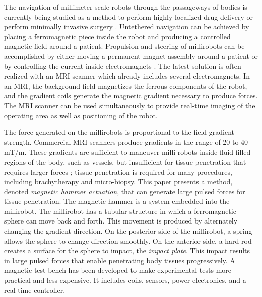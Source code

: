 \documentclass[letterpaper, 10 pt, conference]{ieeeconf}  %
\begin{document}
The navigation of millimeter-scale robots through the passageways of bodies is currently being studied as a method to perform highly localized drug delivery or perform minimally invasive surgery \cite{7067029,702,mi2020295}. Untethered navigation can be achieved by placing a ferromagnetic piece inside the robot and producing a controlled magnetic field around a patient. Propulsion and steering of millirobots can be accomplished by either moving a permanent magnet assembly around a patient \cite{taylor} or by controlling the current inside electromagnets \cite{MRM21638}. The latest solution is often realized with an MRI scanner which already includes several electromagnets. In an MRI, the background field magnetizes the ferrous components of the robot, and the gradient coils generate the magnetic gradient necessary to produce forces. 
The MRI scanner can be used simultaneously to provide real-time imaging of the operating area as well as positioning of the robot.\par
The force generated on the millirobots is proportional to the field gradient strength. 
Commercial MRI scanners produce gradients in the range of 20 to 40 mT/m. 
These gradients are sufficient to maneuver milli-robots inside fluid-filled regions of the body, such as vessels, \cite{martel2007automatic} but insufficient for tissue penetration that requires larger forces \cite{7139341}; tissue penetration is required for many procedures, including brachytherapy and micro-biopsy.
This paper presents a method, denoted  \emph{magnetic hammer actuation}, that can generate large pulsed forces for tissue penetration. 
The magnetic hammer is a system embedded into the millirobot. 
The millirobot has a tubular structure in which a ferromagnetic sphere can move back and forth.
 This movement is produced by alternately changing the gradient direction. 
 On the posterior side of the millirobot, a spring allows the sphere to change direction smoothly. 
 On the anterior side, a hard rod creates a surface for the sphere to impact, the \emph{impact plate}.
  This impact results in large pulsed forces that enable penetrating body tissues progressively.
A magnetic test bench has been developed to make experimental tests more practical and less expensive.
 It includes coils, sensors, power electronics, and a real-time controller.\par
\end{document}

